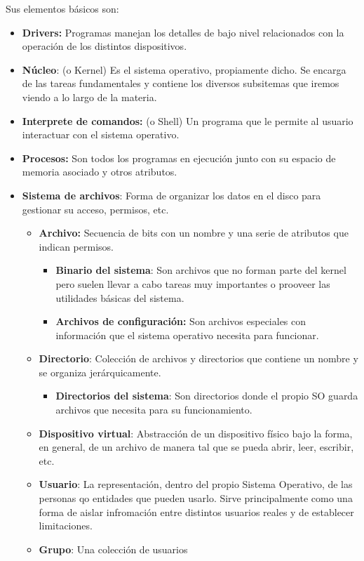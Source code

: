 Sus elementos básicos son:
\begin{itemize}
	\item \textbf{Drivers:} Programas manejan los detalles de bajo nivel relacionados con la operación de los distintos dispositivos.
	\item \textbf{Núcleo}: (o Kernel) Es el sistema operativo, propiamente dicho. Se encarga de las tareas fundamentales y contiene los diversos subsitemas que iremos viendo a lo largo de la materia.
\end{itemize}
\begin{itemize}
	\item \textbf{Interprete de comandos:} (o Shell) Un programa que le permite al usuario interactuar con el sistema operativo.

	\item \textbf{Procesos:} Son todos los programas en ejecución junto con su espacio de memoria asociado y otros atributos.
	
	
	\item\textbf{Sistema de archivos}: Forma de organizar los datos en el disco para gestionar su acceso, permisos, etc.
	\begin{itemize}
			\item \textbf{Archivo:} Secuencia de bits con un nombre y una serie de atributos que indican permisos.
			\begin{itemize}
				\item\textbf{Binario del sistema}: Son archivos que no forman parte del kernel pero suelen llevar a cabo tareas muy importantes o prooveer las utilidades básicas del sistema.
				\item \textbf{Archivos de configuración:} Son archivos especiales con información que el sistema operativo necesita para funcionar.
			\end{itemize}
		
		\item \textbf{Directorio}: Colección de archivos y directorios que contiene un nombre y se organiza jerárquicamente.
		\begin{itemize}
			\item\textbf{Directorios del sistema}: Son directorios donde el propio SO guarda archivos que necesita para su funcionamiento.
		\end{itemize}
		\item \textbf{Dispositivo virtual}: Abstracción de un dispositivo físico bajo la forma, en general, de un archivo de manera tal que se pueda abrir, leer, escribir, etc.
		
		\item \textbf{Usuario}: La representación, dentro del propio Sistema Operativo, de las personas qo entidades que pueden usarlo. Sirve principalmente como una forma de aislar infromación entre distintos usuarios reales y de establecer limitaciones.
		
		\item \textbf{Grupo}: Una colección de usuarios
	\end{itemize}	
\end{itemize}

